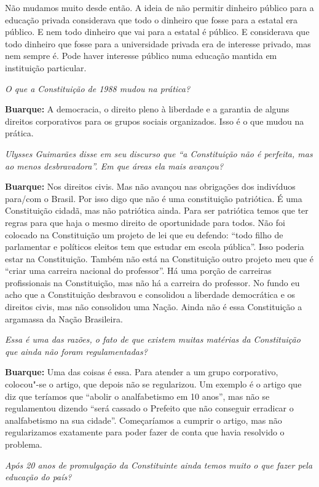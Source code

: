 Não mudamos muito desde então. A ideia de não permitir dinheiro público
para a educação privada considerava que todo o dinheiro que fosse para a
estatal era público. E nem todo dinheiro que vai para a estatal é
público. E considerava que todo dinheiro que fosse para a universidade
privada era de interesse privado, mas nem sempre é. Pode haver interesse
público numa educação mantida em instituição particular.

\emph{O que a Constituição de 1988 mudou na prática?}

\textbf{Buarque:} A democracia, o direito pleno à liberdade e a garantia
de alguns direitos corporativos para os grupos sociais organizados. Isso
é o que mudou na prática.

\emph{Ulysses Guimarães disse em seu discurso que ``a Constituição não
é perfeita, mas ao menos desbravadora''. Em que áreas ela mais avançou?}

\textbf{Buarque:} Nos direitos civis. Mas não avançou nas obrigações dos
indivíduos para/com o Brasil. Por isso digo que não é uma constituição
patriótica. É uma Constituição cidadã, mas não patriótica ainda. Para
ser patriótica temos que ter regras para que haja o mesmo direito de
oportunidade para todos. Não foi colocado na Constituição um projeto de
lei que eu defendo: ``todo filho de parlamentar e políticos eleitos tem
que estudar em escola pública''. Isso poderia estar na Constituição.
Também não está na Constituição outro projeto meu que é ``criar uma
carreira nacional do professor''. Há uma porção de carreiras
profissionais na Constituição, mas não há a carreira do professor. No
fundo eu acho que a Constituição desbravou e consolidou a liberdade
democrática e os direitos civis, mas não consolidou uma Nação. Ainda não
é essa Constituição a argamassa da Nação Brasileira.

\emph{Essa é uma das razões, o fato de que existem muitas matérias da
Constituição que ainda não foram regulamentadas?}

\textbf{Buarque:} Uma das coisas é essa. Para atender a um grupo
corporativo, colocou"-se o artigo, que depois não se regularizou. Um
exemplo é o artigo que diz que teríamos que ``abolir o analfabetismo em
10 anos'', mas não se regulamentou dizendo ``será cassado o Prefeito que
não conseguir erradicar o analfabetismo na sua cidade''. Começaríamos a
cumprir o artigo, mas não regularizamos exatamente para poder fazer de
conta que havia resolvido o problema.

\emph{Após 20 anos de promulgação da Constituinte ainda temos muito o
que fazer pela educação do país?}

